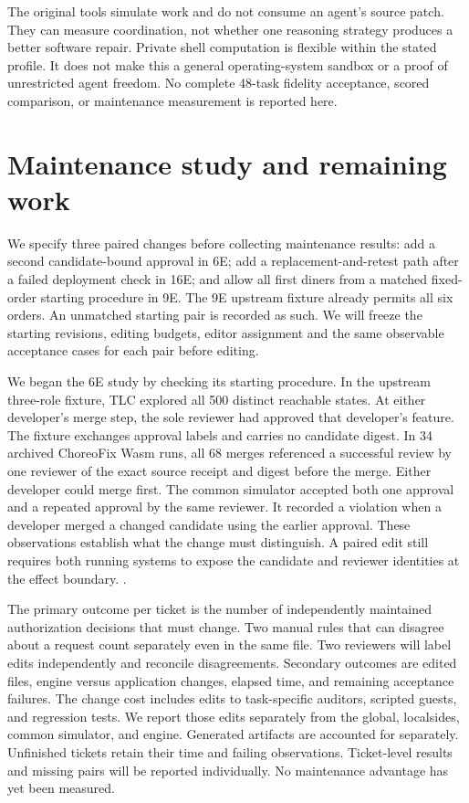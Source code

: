 \documentclass[10pt]{article}
\begin{document}
The original tools simulate work and do not consume an agent's source patch.
They can measure coordination, not whether one reasoning strategy produces a
better software repair. Private shell computation is flexible within the
stated profile. It does not make this a general operating-system sandbox or a
proof of unrestricted agent freedom. No complete 48-task fidelity acceptance,
scored comparison, or maintenance measurement is reported here.

\section{Maintenance study and remaining work}
We specify three paired changes before collecting maintenance results: add a
second candidate-bound approval in 6E; add a replacement-and-retest path after
a failed deployment check in 16E; and allow all first diners from a matched
fixed-order starting procedure in 9E. The 9E upstream fixture already permits
all six orders. An unmatched starting pair is recorded as such. We will freeze
the starting revisions, editing budgets, editor assignment and the same
observable acceptance cases for each pair before editing.

We began the 6E study by checking its starting procedure. In the upstream
three-role fixture, TLC explored all 500 distinct reachable states. At either
developer's merge step, the sole reviewer had approved that developer's
feature. The fixture exchanges approval labels and carries no candidate digest.
In 34 archived ChoreoFix Wasm runs, all 68 merges referenced a successful
review by one reviewer of the exact source receipt and digest before the
merge. Either developer could merge first. The common simulator accepted both
one approval and a repeated approval by the same reviewer. It recorded a
violation when a developer merged a changed candidate using the earlier
approval. These observations establish what the change must distinguish.
A paired edit still requires both running systems to expose the candidate and
reviewer identities at the effect boundary.
.

The primary outcome per ticket is the number of independently maintained
authorization decisions that must change. Two manual rules that can disagree
about a request count separately even in the same file. Two reviewers will
label edits independently and reconcile disagreements. Secondary outcomes are
edited files, engine versus application changes, elapsed time, and remaining
acceptance failures. The change cost includes edits to task-specific auditors,
scripted guests, and regression tests. We report those edits separately from
the global, localsides, common simulator, and engine. Generated artifacts are
accounted for separately.
Unfinished tickets retain their time and failing observations. Ticket-level
results and missing pairs will be reported individually. No maintenance
advantage has yet been measured.
\end{document}
